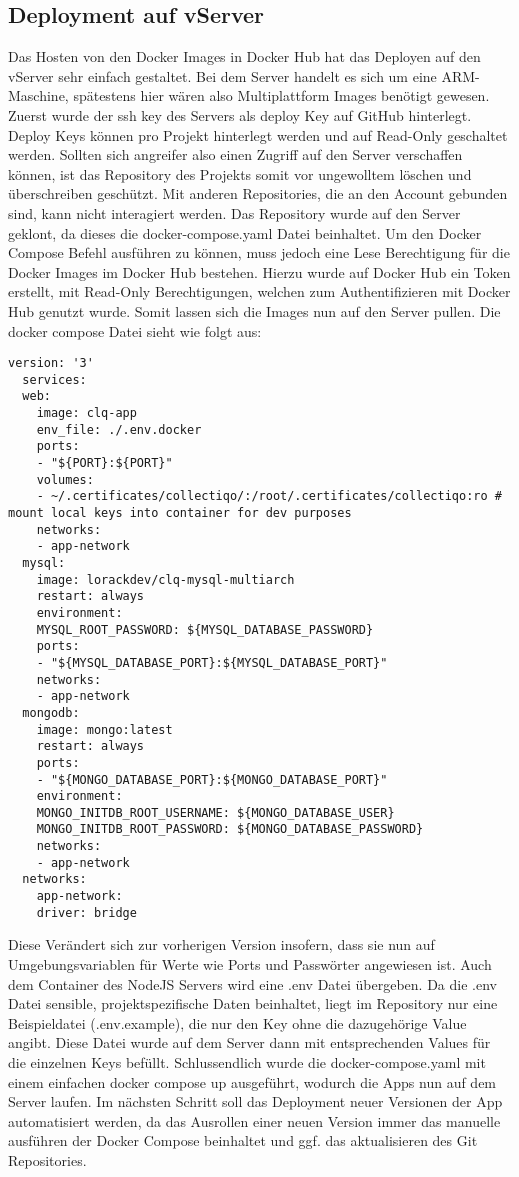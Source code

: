 \subsection{Deployment auf vServer}\label{subsec:deployment-auf-vserver}
Das Hosten von den Docker Images in Docker Hub hat das Deployen auf den vServer sehr einfach gestaltet.
Bei dem Server handelt es sich um eine ARM-Maschine, spätestens hier wären also Multiplattform Images benötigt gewesen.
Zuerst wurde der ssh key des Servers als deploy Key auf GitHub hinterlegt.
Deploy Keys können pro Projekt hinterlegt werden und auf Read-Only geschaltet werden.
Sollten sich angreifer also einen Zugriff auf den Server verschaffen können, ist das Repository des Projekts somit vor ungewolltem löschen und überschreiben geschützt.
Mit anderen Repositories, die an den Account gebunden sind, kann nicht interagiert werden.
Das Repository wurde auf den Server geklont, da dieses die docker-compose.yaml Datei beinhaltet.
Um den Docker Compose Befehl ausführen zu können, muss jedoch eine Lese Berechtigung für die Docker Images im Docker Hub bestehen.
Hierzu wurde auf Docker Hub ein Token erstellt, mit Read-Only Berechtigungen, welchen zum Authentifizieren mit Docker Hub genutzt wurde.
Somit lassen sich die Images nun auf den Server pullen.
Die docker compose Datei sieht wie folgt aus:

\vspace{1em}
\begin{lstlisting}[label={lst:lst-docker-compose-yaml}]
  version: '3'
  services:
  web:
    image: clq-app
    env_file: ./.env.docker
    ports:
    - "${PORT}:${PORT}"
    volumes:
    - ~/.certificates/collectiqo/:/root/.certificates/collectiqo:ro # mount local keys into container for dev purposes
    networks:
    - app-network
  mysql:
    image: lorackdev/clq-mysql-multiarch
    restart: always
    environment:
    MYSQL_ROOT_PASSWORD: ${MYSQL_DATABASE_PASSWORD}
    ports:
    - "${MYSQL_DATABASE_PORT}:${MYSQL_DATABASE_PORT}"
    networks:
    - app-network
  mongodb:
    image: mongo:latest
    restart: always
    ports:
    - "${MONGO_DATABASE_PORT}:${MONGO_DATABASE_PORT}"
    environment:
    MONGO_INITDB_ROOT_USERNAME: ${MONGO_DATABASE_USER}
    MONGO_INITDB_ROOT_PASSWORD: ${MONGO_DATABASE_PASSWORD}
    networks:
    - app-network
  networks:
    app-network:
    driver: bridge
\end{lstlisting}
\vspace{1em}

Diese Verändert sich zur vorherigen Version insofern, dass sie nun auf Umgebungsvariablen für Werte wie Ports und Passwörter angewiesen ist.
Auch dem Container des NodeJS Servers wird eine .env Datei übergeben.
Da die .env Datei sensible, projektspezifische Daten beinhaltet, liegt im Repository nur eine Beispieldatei (.env.example), die nur den Key ohne die dazugehörige Value angibt.
Diese Datei wurde auf dem Server dann mit entsprechenden Values für die einzelnen Keys befüllt.
Schlussendlich wurde die docker-compose.yaml mit einem einfachen docker compose up ausgeführt, wodurch die Apps nun auf dem Server laufen.
Im nächsten Schritt soll das Deployment neuer Versionen der App automatisiert werden, da das Ausrollen einer neuen Version immer das manuelle ausführen der Docker Compose beinhaltet und ggf. das aktualisieren des Git Repositories.
